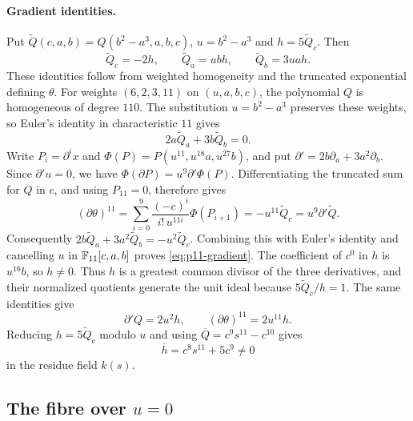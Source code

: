 \paragraph{Gradient identities.}
Put $\widetilde Q(c,a,b) = Q(b^2-a^3,a,b,c)$, $u = b^2-a^3$ and $h = 5\widetilde Q_c$.
Then
\begin{equation}\label{eq:p11-gradient}
  \widetilde Q_c = -2h,\qquad
  \widetilde Q_a = ubh,\qquad
  \widetilde Q_b = 3uah.
\end{equation}
These identities follow from weighted homogeneity and the truncated exponential defining $\theta$.
For weights $(6,2,3,11)$ on $(u,a,b,c)$, the polynomial $Q$ is homogeneous of degree $110$.
The substitution $u = b^2-a^3$ preserves these weights, so Euler's identity in characteristic $11$ gives
\[
  2a\widetilde Q_a+3b\widetilde Q_b = 0.
\]
Write $P_i = \partial^i x$ and $\Phi(P) = P(u^{11},u^{18}a,u^{27}b)$, and put $\partial' = 2b\partial_a+3a^2\partial_b$.
Since $\partial'u = 0$, we have $\Phi(\partial P) = u^9\partial'\Phi(P)$.
Differentiating the truncated sum for $Q$ in $c$, and using $P_{11} = 0$, therefore gives
\[
  (\partial\theta)^{11}
  = \sum_{i=0}^{9}\frac{(-c)^i}{i!\,u^{11i}}\Phi(P_{i+1})
  = -u^{11}\widetilde Q_c
  = u^9\partial'\widetilde Q.
\]
Consequently $2b\widetilde Q_a+3a^2\widetilde Q_b = -u^2\widetilde Q_c$.
Combining this with Euler's identity and cancelling $u$ in $\mathbb{F}_{11}[c,a,b]$ proves \eqref{eq:p11-gradient}.
The coefficient of $c^0$ in $h$ is $u^{16}b$, so $h\neq 0$.
Thus $h$ is a greatest common divisor of the three derivatives, and their normalized quotients generate the unit ideal because $5\widetilde Q_c/h = 1$.
The same identities give
\begin{equation}\label{eq:p11-differentials}
  \partial'Q = 2u^2h,\qquad
  (\partial\theta)^{11} = 2u^{11}h.
\end{equation}
Reducing $h = 5\widetilde Q_c$ modulo $u$ and using $\overline Q = c^9s^{11}-c^{10}$ gives
\begin{equation}\label{eq:p11-h-residue}
  \overline h = c^8s^{11}+5c^9\neq 0
\end{equation}
in the residue field $k(s)$.

\subsection{The fibre over $u = 0$}

